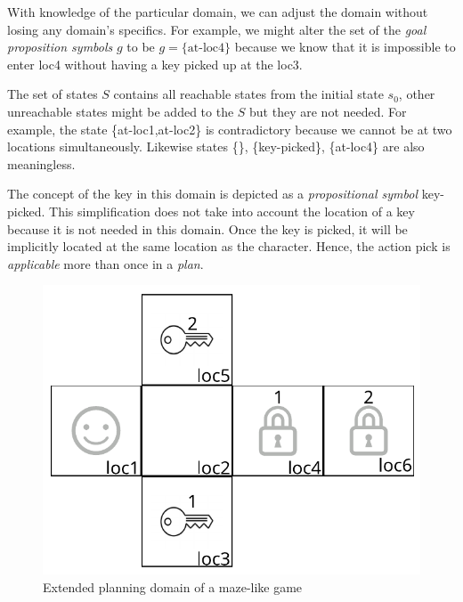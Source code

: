 \medskip\noindent
With knowledge of the particular domain, we can adjust the domain without losing any domain's specifics. For example, we might alter the set of the \emph{goal proposition symbols} $g$ to be $g=\mathrm{\{at\text{-}loc4\}}$ because we know that it is impossible to enter loc4 without having a key picked up at the loc3.

\medskip\noindent
The set of states $S$ contains all reachable states from the initial state $s_0$, other unreachable states might be added to the $S$ but they are not needed. For example, the state \{at-loc1,at-loc2\} is contradictory because we cannot be at two locations simultaneously. Likewise states \{\}, \{key-picked\}, \{at-loc4\} are also meaningless.

\medskip\noindent
The concept of the key in this domain is depicted as a \emph{propositional symbol} key-picked. This simplification does not take into account the location of a key because it is not needed in this domain. Once the key is picked, it will be implicitly located at the same location as the character. Hence, the action pick is \emph{applicable} more than once in a \emph{plan}.

\begin{figure}
    \centering
    \includegraphics{img/output_mares_key2.pdf}
    \caption{Extended planning domain of a maze-like game}
    \label{fig01:2}
\end{figure}

